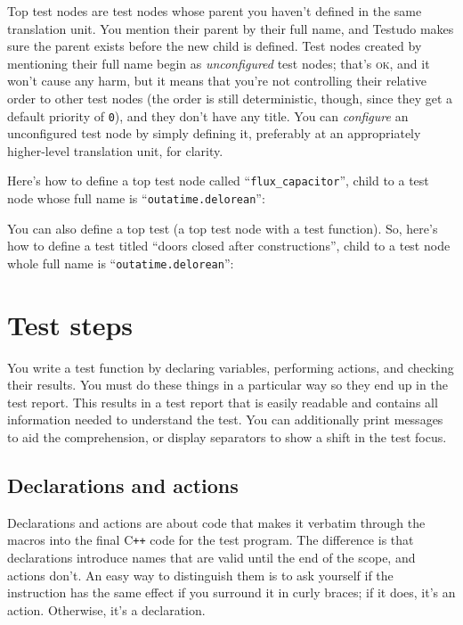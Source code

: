 \documentclass[twoside, a4paper, article]{memoir}
\providecommand\typesetexample[1]{%
}
\newcommand*\Cpp{C\texttt{++}}
\begin{document}
Top test nodes are test nodes whose parent you haven't defined in the same
translation unit.  You mention their parent by their full name, and Testudo
makes sure the parent exists before the new child is defined.  Test nodes
created by mentioning their full name begin as \emph{unconfigured} test nodes;
that's \textsc{ok}, and it won't cause any harm, but it means that you're not
controlling their relative order to other test nodes (the order is still
deterministic, though, since they get a default priority of \texttt{0}), and
they don't have any title.  You can \emph{configure} an unconfigured test node
by simply defining it, preferably at an appropriately higher-level translation
unit, for clarity.

Here's how to define a top test node called ``\texttt{flux\_capacitor}'', child
to a test node whose full name is ``\texttt{outatime.delorean}'':

\typesetexample{top-test-node}

You can also define a top test (a top test node with a test function).  So,
here's how to define a test titled ``doors closed after constructions'', child
to a test node whole full name is ``\texttt{outatime.delorean}'':

\typesetexample{top-test}


\chapter{Test steps}
\label{cha:test-steps}

You write a test function by declaring variables, performing actions, and
checking their results.  You must do these things in a particular way so they
end up in the test report.  This results in a test report that is easily
readable and contains all information needed to understand the test.  You can
additionally print messages to aid the comprehension, or display separators to
show a shift in the test focus.

\section{Declarations and actions}
\label{sec:declarations-actions}

Declarations and actions are about code that makes it verbatim through the
macros into the final \Cpp{} code for the test program.  The difference is that
declarations introduce names that are valid until the end of the scope, and
actions don't.  An easy way to distinguish them is to ask yourself if the
instruction has the same effect if you surround it in curly braces; if it does,
it's an action. Otherwise, it's a declaration.
\end{document}
